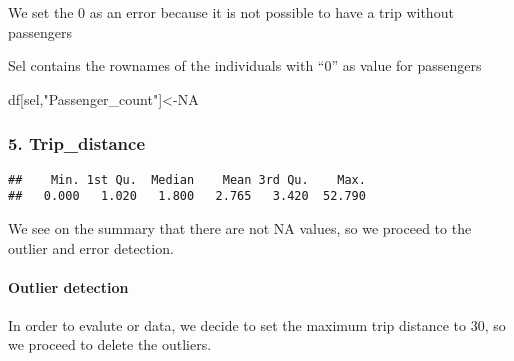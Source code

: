 \documentclass[
  18pt,
  a4paper]{article}
\newenvironment{Shaded}{\begin{snugshade}}{\end{snugshade}}
\newcommand{\CommentTok}[1]{\textcolor[rgb]{0.56,0.35,0.01}{\textit{#1}}}
\newcommand{\DecValTok}[1]{\textcolor[rgb]{0.00,0.00,0.81}{#1}}
\newcommand{\KeywordTok}[1]{\textcolor[rgb]{0.13,0.29,0.53}{\textbf{#1}}}
\newcommand{\NormalTok}[1]{#1}
\newcommand{\OperatorTok}[1]{\textcolor[rgb]{0.81,0.36,0.00}{\textbf{#1}}}
\newcommand{\OtherTok}[1]{\textcolor[rgb]{0.56,0.35,0.01}{#1}}
\newcommand{\StringTok}[1]{\textcolor[rgb]{0.31,0.60,0.02}{#1}}
\begin{document}
We set the 0 as an error because it is not possible to have a trip
without passengers

\begin{Shaded}
\end{Shaded}

Sel contains the rownames of the individuals with ``0'' as value for
passengers

\begin{Shaded}
\begin{Highlighting}[]
\NormalTok{df[sel,}\StringTok{"Passenger_count"}\NormalTok{]<-}\OtherTok{NA}
\end{Highlighting}
\end{Shaded}

\hypertarget{trip_distance}{%
\subsubsection{5. Trip\_distance}\label{trip_distance}}

\begin{Shaded}
\end{Shaded}

\begin{verbatim}
##    Min. 1st Qu.  Median    Mean 3rd Qu.    Max. 
##   0.000   1.020   1.800   2.765   3.420  52.790
\end{verbatim}

We see on the summary that there are not NA values, so we proceed to the
outlier and error detection.

\hypertarget{outlier-detection-1}{%
\paragraph{Outlier detection}\label{outlier-detection-1}}

In order to evalute or data, we decide to set the maximum trip distance
to 30, so we proceed to delete the outliers.
\end{document}
